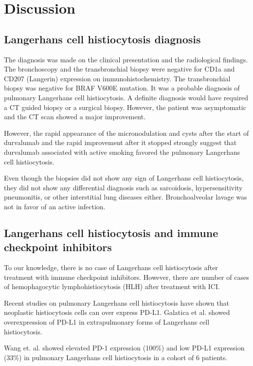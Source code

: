 \documentclass{article}
\begin{document}
\section{Discussion}
\subsection{Langerhans cell histiocytosis diagnosis}
The diagnosis was made on the clinical presentation and the radiological findings. The bronchoscopy and the transbronchial biopsy were negative for CD1a and CD207 (Langerin) expression on immunohistochemistry. The transbronchial biopsy was negative for BRAF V600E mutation. 
It was a probable diagnosis of pulmonary Langerhans cell histiocytosis. A definite diagnosis would have required a CT guided biopsy or a surgical biopsy. However, the patient was asymptomatic and the CT scan showed a major improvement. 

However, the rapid appearance of the micronodulation and cysts after the start of durvalumab and the rapid improvement after it stopped strongly suggest that durvalumab associated with active smoking favored the pulmonary Langerhans cell histiocytosis.

Even though the biopsies did not show any sign of Langerhans cell histiocytosis, they did not show any differential diagnosis such as sarcoidosis, hypersensitivity pneumonitis, or other interstitial lung diseases either. Bronchoalveolar lavage was not in favor of an active infection.

\subsection{Langerhans cell histiocytosis and immune checkpoint inhibitors}
To our knowledge, there is no case of Langerhans cell histiocytosis after treatment with immune checkpoint inhibitors. 
However, there are number of cases of hemophagocytic lymphohistiocytosis (HLH) after treatment with ICI. \cite{sadaat_hemophagocytic_2018, takeshita_coincidence_2017, noseda_haemophagocytic_2019}

Recent studies on pulmonary Langerhans cell histiocytosis have shown that neoplastic histiocytosis cells can over express PD-L1.
Galatica et al. showed overexpression of PD-L1 in extrapulmonary forms of Langerhans cell histiocytosis. \cite{gatalica_disseminated_2015}

Wang et. al. showed elevated PD-1 expression (100\%) and low PD-L1 expression (33\%) in pulmonary Langerhans cell histiocytosis in a cohort of 6 patients. \cite{wang_adult_2021}
\end{document}
